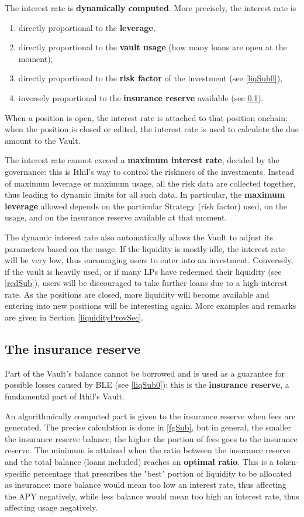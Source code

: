 \documentclass[a4paper,10 pt]{article}
\theoremstyle{definition}
\begin{document}
The interest rate is {\bf dynamically computed}. More precisely, the interest rate is
\begin{enumerate} 
\item directly proportional to the {\bf leverage}, 
\item directly proportional to the {\bf vault usage} (how many loans are open at the moment), 
\item directly proportional to the {\bf risk factor} of the investment (see \ref{liqSub0}),
\item inversely proportional to the {\bf insurance reserve} available (see \ref{insResSub}).
\end{enumerate}
When a position is open, the interest rate is attached to that position onchain: when the position is closed or edited, the interest rate is used to calculate the due amount to the Vault.

The interest rate cannot exceed a {\bf maximum interest rate}, decided by the governance: this is Ithil's way to control the riskiness of the investments. Instead of maximum leverage or maximum usage, all the risk data are collected together, thus leading to dynamic limits for all such data. In particular, the {\bf maximum leverage} allowed depends on the particular Strategy (risk factor) used, on the usage, and on the insurance reserve available at that moment. 

The dynamic interest rate also automatically allows the Vault to adjust its parameters based on the usage. If the liquidity is mostly idle, the interest rate will be very low, thus encouraging users to enter into an investment. Conversely, if the vault is heavily used, or if many LPs have redeemed their liquidity (see \ref{redSub}), users will be discouraged to take further loans due to a high-interest rate. As the positions are closed, more liquidity will become available and entering into new positions will be interesting again. More examples and remarks are given in Section \ref{liquidityProvSec}.

\subsection{The insurance reserve}\label{insResSub}

Part of the Vault's balance cannot be borrowed and is used as a guarantee for possible losses caused by BLE (see \ref{liqSub0}): this is the {\bf insurance reserve}, a fundamental part of Ithil's Vault.

An algorithmically computed part is given to the insurance reserve when fees are generated. The precise calculation is done in \ref{fgSub}, but in general, the smaller the insurance reserve balance, the higher the portion of fees goes to the insurance reserve. The minimum is attained when the ratio between the insurance reserve and the total balance (loans included) reaches an {\bf optimal ratio}. This is a token-specific percentage that prescribes the "best" portion of liquidity to be allocated as insurance: more balance would mean too low an interest rate, thus affecting the APY negatively, while less balance would mean too high an interest rate, thus affecting usage negatively.
\end{document}
